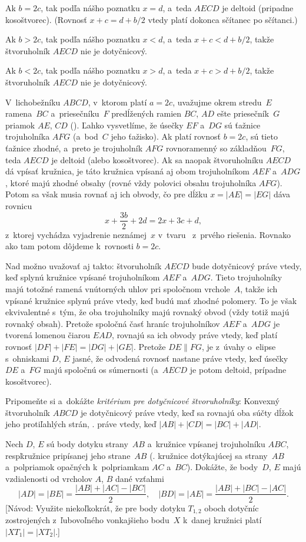 {Ak $b=2c$, tak podľa nášho poznatku $x=d$, a~teda
$AECD$ je deltoid (pripadne kosoštvorec). (Rovnosť
$x+c=d+b/2$ vtedy platí dokonca sčítanec po sčítanci.)

Ak $b>2c$, tak podľa nášho poznatku $x<d$, a~teda
$x+c<d+b/2$, takže štvoruholník
$AECD$ nie je dotyčnicový.

Ak $b<2c$, tak podľa nášho poznatku $x>d$, a~teda
$x+c>d+b/2$, takže štvoruholník $AECD$ nie je dotyčnicový.

\ineriesenie
V~lichobežníku $ABCD$, v~ktorom platí $a=2c$,
uvažujme okrem stredu~$E$ ramena~$BC$ a~priesečníku~$F$
predĺžených ramien $BC$, $AD$ ešte priesečník~$G$ priamok $AE$,
$CD$ (\obr). Ľahko vysvetlíme, že úsečky $EF$ a~$DG$ sú
\inspicture{}
ťažnice trojuholníka $AFG$ (a~bod~$C$ jeho ťažisko).
Ak platí rovnosť $b=2c$, sú tieto ťažnice
zhodné, a~preto je trojuholník $AFG$ rovnoramenný so základňou~$FG$,
teda $AECD$ je deltoid (alebo kosoštvorec). Ak sa naopak
štvoruholníku $AECD$ dá vpísať kružnica, je táto kružnica vpísaná 
aj obom trojuholníkom $AEF$ a~$ADG$, ktoré majú zhodné obsahy (rovné
vždy polovici obsahu trojuholníka $AFG$).
Potom sa však musia rovnať aj ich obvody,
čo pre dĺžku $x=|AE|=|EG|$ dáva rovnicu
$$
x+\frac{3b}{2}+2d=2x+3c+d,
$$
z~ktorej vychádza vyjadrenie neznámej~$x$ v~tvaru~ z~prvého
riešenia. Rovnako ako tam potom dôjdeme k~rovnosti $b=2c$.

Nad  možno uvažovať aj takto: štvoruholník
$AECD$ bude dotyčnicový práve vtedy, keď splynú kružnice vpísané trojuholníkom
$AEF$ a~$ADG$. Tieto trojuholníky majú totožné ramená vnútorných uhlov pri
spoločnom vrchole~$A$, takže ich vpísané kružnice splynú
práve vtedy, keď budú mať zhodné polomery. To je však ekvivalentné
s~tým, že oba trojuholníky majú rovnaký obvod (vždy totiž majú rovnaký
obsah). Pretože spoločná časť hraníc trojuholníkov $AEF$ a~$ADG$ je
tvorená lomenou čiarou $EAD$, rovnajú sa ich obvody práve vtedy, keď
platí rovnosť $|DF|+|FE|=|DG|+|GE|$. Pretože $DE\parallel FG$, je
z~úvahy o~elipse s~ohniskami $D$, $E$ jasné, že odvodená rovnosť
nastane práve vtedy, keď úsečky $DE$ a~$FG$ majú spoločnú os
súmernosti (a~$AECD$ je potom deltoid, prípadne kosoštvorec).

Pripomeňte si a~dokážte {\it kritérium pre dotyčnicové
štvoruholníky\/}: Konvexný štvoruholník $ABCD$ je dotyčnicový
práve vtedy, keď sa rovnajú oba súčty dĺžok jeho protiľahlých strán,
\tj. práve vtedy, keď $|AB|+|CD|=|BC|+|AD|$.

Nech $D$, $E$ sú body dotyku strany~$AB$ 
a~kružnice vpísanej trojuholníku $ABC$, resp\. kružnice pripísanej jeho
strane~$AB$ (\tj. kružnice dotýkajúcej sa
strany~$AB$ a~polpriamok opačných k~polpriamkam $AC$ a~$BC$).
Dokážte, že body~$D$, $E$ majú vzdialenosti od vrcholov $A$, $B$
dané vzťahmi
$$
|AD|=|BE|=\frac{|AB|+|AC|-|BC|}{2},\quad
|BD|=|AE|=\frac{|AB|+|BC|-|AC|}{2}.
$$
[Návod: Využite niekoľkokrát, že pre body dotyku $T_{1,2}$
oboch dotyčníc zostrojených z~ľubovoľného vonkajšieho bodu~$X$ k~danej
kružnici platí $|XT_1|=|XT_2|$.]

}
